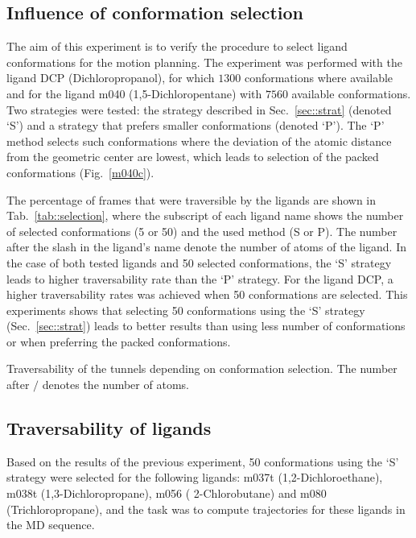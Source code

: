 \documentclass[usletter, 10pt, conference]{ieeeconf} %
\begin{document}
\subsection{Influence of conformation selection}

The aim of this experiment is to verify the procedure to select ligand conformations for the motion planning.
The experiment was performed with the ligand DCP (Dichloropropanol), for which $1300$ conformations where available and for the ligand
m040 (1,5-Dichloropentane) with $7560$ available conformations.
Two strategies were tested: the strategy described in Sec.~\ref{sec::strat} (denoted `S') and a strategy that prefers smaller conformations (denoted `P').
The `P' method selects such conformations where the deviation of the atomic distance from the geometric center are lowest, which leads 
to selection of the packed conformations (Fig.~\ref{m040c}).

The percentage of frames that were traversible by the ligands are shown in Tab.~\ref{tab::selection}, where the subscript of each ligand
name shows the number of selected conformations (5 or 50) and the used method (S or P).
The number after the slash in the ligand's name denote the number of atoms of the ligand.
In the case of both tested ligands and 50 selected conformations, the `S' strategy leads to higher traversability rate than the `P' strategy.
For the ligand DCP, a higher traversability rates was achieved when 50 conformations are selected.
This experiments shows that selecting 50 conformations using the `S' strategy (Sec.~\ref{sec::strat}) leads to better results
than using less number of conformations or when preferring the packed conformations.

\begin{table}
\centering
\caption{\label{tab::selection}
    Traversability of the tunnels depending on conformation selection.
    The number after $/$ denotes the number of atoms.
}
\small
\renewcommand{\tabcolsep}{3pt}
{\small

}
\end{table}





\subsection{Traversability of ligands}

Based on the results of the previous experiment, 50 conformations using the `S' strategy were selected for the following
ligands: m037t (1,2-Dichloroethane), m038t (1,3-Dichloropropane), m056 ( 2-Chlorobutane) and m080 (Trichloropropane), and
the task was to compute trajectories for these ligands in the MD sequence.
\end{document}
